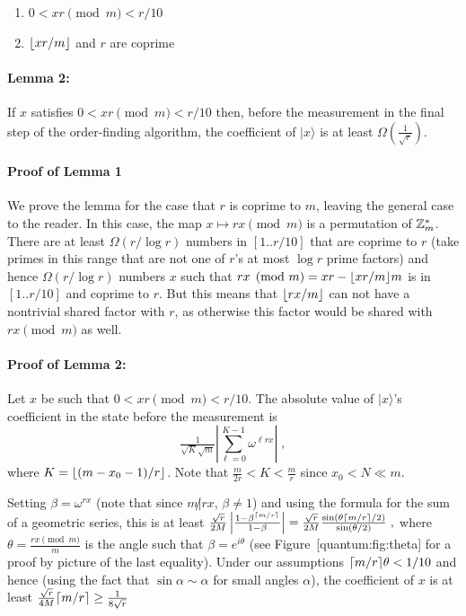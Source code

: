 \begin{enumerate}
\def\labelenumi{\arabic{enumi}.}
\item
  \(0 < xr \pmod{m} < r/10\)
\item
  \(\lfloor xr/m \rfloor\) and \(r\) are coprime
\end{enumerate}

\paragraph{Lemma 2:} If \(x\) satisfies \(0 < xr \pmod{m} < r/10\) then,
before the measurement in the final step of the order-finding algorithm,
the coefficient of \(|x\rangle\) is at least
\(\Omega(\tfrac{1}{\sqrt{r}})\).

\paragraph{Proof of Lemma 1} We prove the lemma for the case that \(r\)
is coprime to \(m\), leaving the general case to the reader. In this
case, the map \(x \mapsto rx \pmod{m}\) is a permutation of \({\mathbb{Z}}^*_m\).
There are at least \(\Omega(r/\log r)\) numbers in \([1..r/10]\) that
are coprime to \(r\) (take primes in this range that are not one of
\(r\)'s at most \(\log r\) prime factors) and hence \(\Omega(r/\log r)\)
numbers \(x\) such that \(rx \pmod{m} = xr - \lfloor xr/m \rfloor m\) is in
\([1..r/10]\) and coprime to \(r\). But this means that \(\lfloor rx/m \rfloor\)
can not have a nontrivial shared factor with \(r\), as otherwise this
factor would be shared with \(rx \pmod{m}\) as well.

\paragraph{Proof of Lemma 2:} Let \(x\) be such that
\(0 < xr \pmod{m} < r/10\). The absolute value of \(|x\rangle\)'s
coefficient in the state before the measurement is
\begin{equation*}
\tfrac{1}{\sqrt{K}\sqrt{m}}\left| \sum_{\ell=0}^{K-1} \omega^{\ell r x} \right| \;,
\end{equation*}
where \(K = \lfloor (m-x_0-1)/r \rfloor\). Note that
\(\tfrac{m}{2r} < K < \tfrac{m}{r}\) since \(x_0 < N \ll m\).

Setting \(\beta=\omega^{rx}\) (note that since \(m \not| rx\),
\(\beta \neq 1\)) and using the formula for the sum of a geometric
series, this is at least
\(\tfrac{\sqrt{r}}{2M}\left| \tfrac{1 - \beta^{\lceil m/r \rceil}}{1-\beta} \right| = \tfrac{\sqrt{r}}{2M}\tfrac{\sin(\theta\lceil m/r \rceil/2)}{\sin(\theta/2)} \;,\)
where \(\theta=\tfrac{rx \pmod{m}}{m}\) is the angle such that
\(\beta = e^{i\theta}\) (see Figure~{[}quantum:fig:theta{]} for a proof
by picture of the last equality). Under our assumptions
\(\lceil m/r \rceil\theta<1/10\) and hence (using the fact that
\(\sin \alpha \sim \alpha\) for small angles \(\alpha\)), the
coefficient of \(x\) is at least
\(\tfrac{\sqrt{r}}{4M}\lceil m/r \rceil \geq \tfrac{1}{8\sqrt{r}}\)

